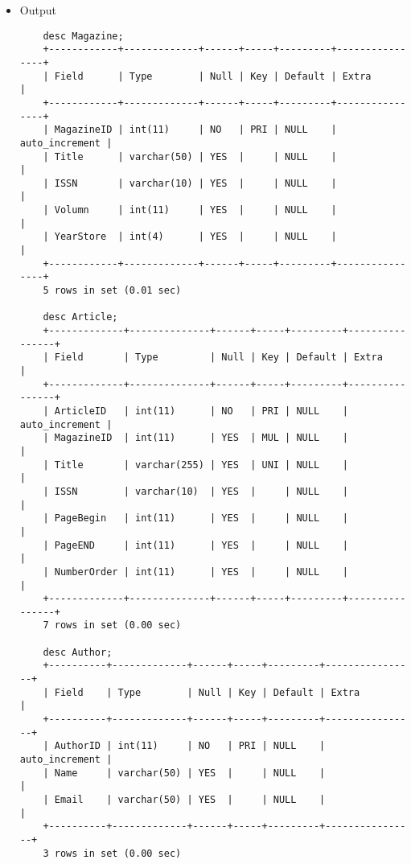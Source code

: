 \documentclass[13pt,a4paper]{report}
\begin{document}
\begin{itemize}
\begin{lstlisting}
	CREATE TABLE Article ( 
		ArticleID INT NOT NULL AUTO_INCREMENT, 
		MagazineID INT,
		Title VARCHAR(255) UNIQUE , 
		ISSN VARCHAR(10), 
		PageBegin INT, 
		PageEND INT, 
		NumberOrder INT, 
		PRIMARY KEY (ArticleID),
		FOREIGN KEY (MagazineID) REFERENCES Magazine (MagazineID)
	);

	CREATE TABLE Author ( 
		AuthorID INT NOT NULL AUTO_INCREMENT, 
		Name VARCHAR(50), 
		Email VARCHAR(50), 
		PRIMARY KEY (AuthorID)
	);

	CREATE TABLE Article_Author ( 
		AuthorID INT, 
		ArticleID INT,
		Asciption VARCHAR(50), 
		FOREIGN KEY (AuthorID) REFERENCES Author(AuthorID), 
		FOREIGN KEY (ArticleID) REFERENCES Article(ArticleID),
		UNIQUE (ArticleID, AuthorID)
	);
\end{lstlisting}
\item Output
\begin{lstlisting}
	desc Magazine;
	+------------+-------------+------+-----+---------+----------------+
	| Field      | Type        | Null | Key | Default | Extra          |
	+------------+-------------+------+-----+---------+----------------+
	| MagazineID | int(11)     | NO   | PRI | NULL    | auto_increment |
	| Title      | varchar(50) | YES  |     | NULL    |                |
	| ISSN       | varchar(10) | YES  |     | NULL    |                |
	| Volumn     | int(11)     | YES  |     | NULL    |                |
	| YearStore  | int(4)      | YES  |     | NULL    |                |
	+------------+-------------+------+-----+---------+----------------+
	5 rows in set (0.01 sec)

	desc Article;
	+-------------+--------------+------+-----+---------+----------------+
	| Field       | Type         | Null | Key | Default | Extra          |
	+-------------+--------------+------+-----+---------+----------------+
	| ArticleID   | int(11)      | NO   | PRI | NULL    | auto_increment |
	| MagazineID  | int(11)      | YES  | MUL | NULL    |                |
	| Title       | varchar(255) | YES  | UNI | NULL    |                |
	| ISSN        | varchar(10)  | YES  |     | NULL    |                |
	| PageBegin   | int(11)      | YES  |     | NULL    |                |
	| PageEND     | int(11)      | YES  |     | NULL    |                |
	| NumberOrder | int(11)      | YES  |     | NULL    |                |
	+-------------+--------------+------+-----+---------+----------------+
	7 rows in set (0.00 sec)

	desc Author;
	+----------+-------------+------+-----+---------+----------------+
	| Field    | Type        | Null | Key | Default | Extra          |
	+----------+-------------+------+-----+---------+----------------+
	| AuthorID | int(11)     | NO   | PRI | NULL    | auto_increment |
	| Name     | varchar(50) | YES  |     | NULL    |                |
	| Email    | varchar(50) | YES  |     | NULL    |                |
	+----------+-------------+------+-----+---------+----------------+
	3 rows in set (0.00 sec)


\end{lstlisting}
\end{itemize}
\end{document}
